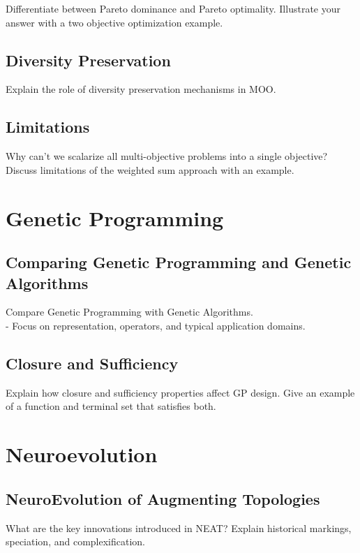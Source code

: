 \documentclass[journal,12pt,onecolumn]{IEEEtran}
\begin{document}
Differentiate between Pareto dominance and Pareto optimality. Illustrate your answer with a two objective optimization example.

\subsection{Diversity Preservation}

Explain the role of diversity preservation mechanisms in MOO.

\subsection{Limitations}

Why can't we scalarize all multi-objective problems into a single objective? Discuss limitations of the weighted sum approach with an example.


\section{Genetic Programming}

\subsection{Comparing Genetic Programming and Genetic Algorithms}

Compare Genetic Programming with Genetic Algorithms. \\
- Focus on representation, operators, and typical application domains.

\subsection{Closure and Sufficiency}

Explain how closure and sufficiency properties affect GP design. Give an example of a function and terminal set that satisfies both.

\section{Neuroevolution}

\subsection{NeuroEvolution of Augmenting Topologies}

What are the key innovations introduced in NEAT? Explain historical markings, speciation, and complexification.
\end{document}
